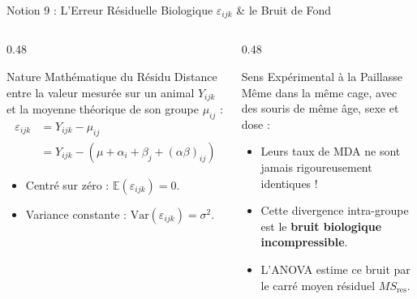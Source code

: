 \documentclass[aspectratio=169,10pt]{beamer}
\begin{document}
\begin{frame}{Notion 9 : L'Erreur Résiduelle Biologique $\varepsilon_{ijk}$ \& le Bruit de Fond}
  \begin{columns}[onlytextwidth, T]
    \begin{column}{0.48\linewidth}
      \begin{conceptbox}{Nature Mathématique du Résidu}
        Distance entre la valeur mesurée sur un animal $Y_{ijk}$ et la moyenne théorique de son groupe $\mu_{ij}$ :
        \begin{align*}
          \varepsilon_{ijk} &= Y_{ijk} - \mu_{ij} \\
          &= Y_{ijk} - (\mu + \alpha_i + \beta_j + (\alpha\beta)_{ij})
        \end{align*}
        \begin{itemize}
          \item Centré sur zéro : $\mathbb{E}(\varepsilon_{ijk}) = 0$.
          \item Variance constante : $\mathrm{Var}(\varepsilon_{ijk}) = \sigma^2$.
        \end{itemize}
      \end{conceptbox}
    \end{column}
    \begin{column}{0.48\linewidth}
      \begin{biobox}{Sens Expérimental à la Paillasse}
        Même dans la même cage, avec des souris de même âge, sexe et dose :
        \begin{itemize}
          \item Leurs taux de MDA ne sont jamais rigoureusement identiques !
          \item Cette divergence intra-groupe est le \textbf{bruit biologique incompressible}.
          \item L'ANOVA estime ce bruit par le carré moyen résiduel $MS_{\text{res}}$.
        \end{itemize}
      \end{biobox}
    \end{column}
  \end{columns}
\end{frame}
\end{document}
